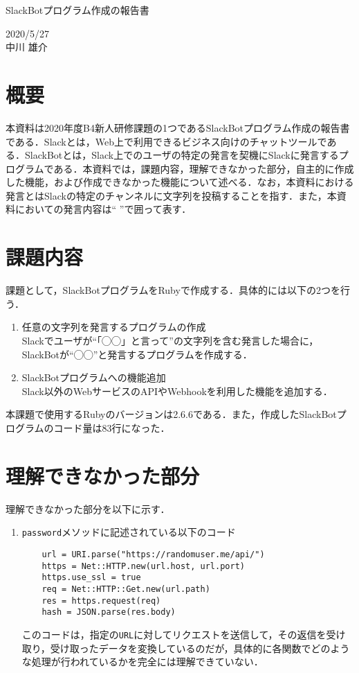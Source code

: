 \documentclass[12pt]{jsarticle}
\begin{document}
\begin{center}
{\LARGE SlackBotプログラム作成の報告書}
\end{center}

\begin{flushright}
  2020/5/27\\
  中川 雄介
\end{flushright}
\section{概要}\label{sec1}
\label{sec:introduction}
本資料は2020年度B4新人研修課題の1つであるSlackBotプログラム作成の報告書である．Slackとは，Web上で利用できるビジネス向けのチャットツールである．SlackBotとは，Slack上でのユーザの特定の発言を契機にSlackに発言するプログラムである．本資料では，課題内容，理解できなかった部分，自主的に作成した機能，および作成できなかった機能について述べる．なお，本資料における発言とはSlackの特定のチャンネルに文字列を投稿することを指す．また，本資料においての発言内容は`` ''で囲って表す．

\section{課題内容}\label{sec2}
課題として，SlackBotプログラムをRubyで作成する．具体的には以下の2つを行う．
\begin{enumerate}
\item 任意の文字列を発言するプログラムの作成\\
  Slackでユーザが``「◯◯」と言って''の文字列を含む発言した場合に，SlackBotが``◯◯''と発言するプログラムを作成する．\label{item1}
\item SlackBotプログラムへの機能追加\\
  Slack以外のWebサービスのAPIやWebhookを利用した機能を追加する．\label{item2}
\end{enumerate}
本課題で使用するRubyのバージョンは2.6.6である．また，作成したSlackBotプログラムのコード量は83行になった．

\section{理解できなかった部分}\label{sec3}
理解できなかった部分を以下に示す．
\begin{enumerate}
  \item \verb|password|メソッドに記述されている以下のコード
\begin{verbatim}
    url = URI.parse("https://randomuser.me/api/")
    https = Net::HTTP.new(url.host, url.port)
    https.use_ssl = true
    req = Net::HTTP::Get.new(url.path)
    res = https.request(req)
    hash = JSON.parse(res.body)
\end{verbatim}
このコードは，指定の\verb|URL|に対してリクエストを送信して，その返信を受け取り，受け取ったデータを変換しているのだが，具体的に各関数でどのような処理が行われているかを完全には理解できていない．
\end{enumerate}
   
\end{document}
